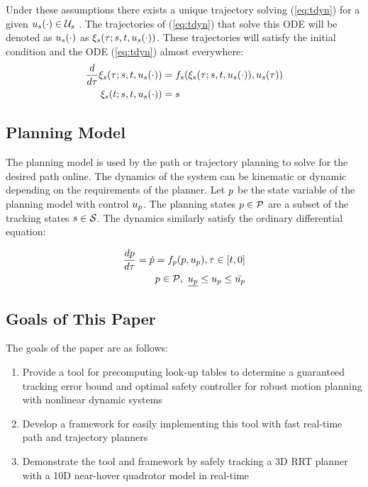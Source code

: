 Under these assumptions there exists a unique trajectory solving (\ref{eq:tdyn}) for a given $u_s(\cdot) \in \mathcal{U}_s$ \cite{Coddington84}. The trajectories of (\ref{eq:tdyn}) that solve this ODE will be denoted as $u_s(\cdot)$ as $\xi_{s}(\tau; s, t, u_s(\cdot))$. These trajectories will satisfy the initial condition and the ODE (\ref{eq:tdyn}) almost everywhere:
\begin{equation}
\label{eq:fdyn_traj}
\begin{aligned}
\frac{d}{d\tau}\xi_{s}(\tau; s, t, u_s(\cdot)) &= f_s(\xi_{s}(\tau; s, t, u_s(\cdot)), u_s(\tau)) \\
\xi_{s}(t; s, t, u_s(\cdot)) &= s
\end{aligned}
\end{equation}

\subsection{Planning Model}
The planning model is used by the path or trajectory planning to solve for the desired path online. The dynamics of the system can be kinematic or dynamic depending on the requirements of the planner. Let $p$ be the state variable of the planning model with control $u_p$. The planning states $p \in \mathcal{P}$ are a subset of the tracking states $s \in \mathcal{S}$. The dynamics similarly satisfy the ordinary differential equation:

\begin{equation}
\begin{aligned}
\label{eq:pdyn}
\frac{dp}{d\tau} = \dot{p} = f_p(p, u_p), \tau \in [t, 0] \\
p \in \mathcal{P}, \ \underline{u_p} \leq u_p \leq \bar{u_p}
\end{aligned}
\end{equation}

\subsection{Goals of This Paper}
The goals of the paper are as follows:
\begin{enumerate}
	\item Provide a tool for precomputing look-up tables to determine a guaranteed tracking error bound and optimal safety controller for robust motion planning with nonlinear dynamic systems
	\item Develop a framework for easily implementing this tool with fast real-time path and trajectory planners
	\item Demonstrate the tool and framework by safely tracking a 3D RRT planner with a 10D near-hover quadrotor model in real-time
\end{enumerate}
